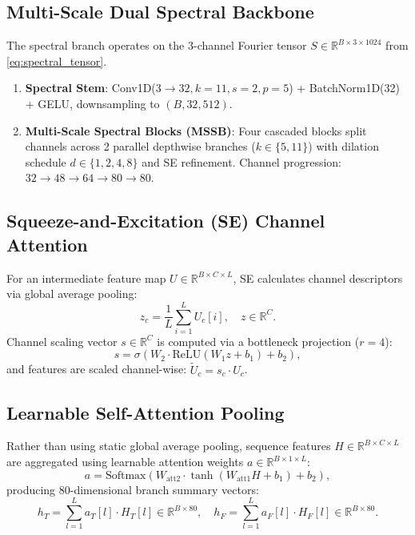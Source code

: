 \documentclass[journal,10pt,twocolumn]{IEEEtran}
\begin{document}
\subsection{Multi-Scale Dual Spectral Backbone}
The spectral branch operates on the 3-channel Fourier tensor $S \in \mathbb{R}^{B \times 3 \times 1024}$ from \eqref{eq:spectral_tensor}.
\begin{enumerate}
    \item \textbf{Spectral Stem}: Conv1D($3 \rightarrow 32, k=11, s=2, p=5$) + BatchNorm1D(32) + GELU, downsampling to $(B, 32, 512)$.
    \item \textbf{Multi-Scale Spectral Blocks (MSSB)}: Four cascaded blocks split channels across 2 parallel depthwise branches ($k \in \{5, 11\}$) with dilation schedule $d \in \{1, 2, 4, 8\}$ and SE refinement. Channel progression: $32 \rightarrow 48 \rightarrow 64 \rightarrow 80 \rightarrow 80$.
\end{enumerate}

\subsection{Squeeze-and-Excitation (SE) Channel Attention}
For an intermediate feature map $U \in \mathbb{R}^{B \times C \times L}$, SE \cite{hu2018squeeze} calculates channel descriptors via global average pooling:
\begin{equation}
z_c = \frac{1}{L} \sum_{i=1}^L U_c[i], \quad z \in \mathbb{R}^C.
\label{eq:se_pool}
\end{equation}
Channel scaling vector $s \in \mathbb{R}^C$ is computed via a bottleneck projection ($r = 4$):
\begin{equation}
s = \sigma\left(W_2 \cdot \text{ReLU}\left(W_1 z + b_1\right) + b_2\right),
\label{eq:se_gate}
\end{equation}
and features are scaled channel-wise: $\tilde{U}_c = s_c \cdot U_c$.

\subsection{Learnable Self-Attention Pooling}
Rather than using static global average pooling, sequence features $H \in \mathbb{R}^{B \times C \times L}$ are aggregated using learnable attention weights $a \in \mathbb{R}^{B \times 1 \times L}$:
\begin{equation}
a = \text{Softmax}\left(W_{\text{att2}} \cdot \tanh\left(W_{\text{att1}} H + b_1\right) + b_2\right),
\label{eq:attn_weights}
\end{equation}
producing 80-dimensional branch summary vectors:
\begin{equation}
h_T = \sum_{l=1}^L a_T[l] \cdot H_T[l] \in \mathbb{R}^{B \times 80}, \quad h_F = \sum_{l=1}^L a_F[l] \cdot H_F[l] \in \mathbb{R}^{B \times 80}.
\label{eq:attn_pool}
\end{equation}
\end{document}
